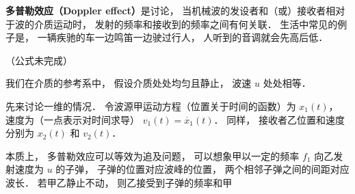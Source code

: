 
\textbf{多普勒效应（Doppler effect）}是讨论， 当机械波的发设者和（或）接收者相对于波的介质运动时， 发射的频率和接收到的频率之间有何关联． 生活中常见的例子是， 一辆疾驰的车一边鸣笛一边驶过行人， 人听到的音调就会先高后低．

（公式未完成）

我们在介质的参考系中， 假设介质处处均匀且静止， 波速 $u$ 处处相等．

先来讨论一维的情况． 令波源甲运动方程（位置关于时间的函数）为 $x_1(t)$， 速度为（一点表示对时间求导） $v_1(t) = \dot{x_1}(t)$． 同样， 接收者乙位置和速度分别为 $x_2(t)$ 和 $v_2(t)$．

本质上， 多普勒效应可以等效为追及问题， 可以想象甲以一定的频率 $f_1$ 向乙发射速度为 $u$ 的子弹， 子弹的位置对应波峰的位置， 两个相邻子弹之间的间距对应波长． 若甲乙静止不动， 则乙接受到子弹的频率和甲
